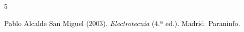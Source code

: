 \documentclass[../main]{subfiles}
\begin{document}
\begin{thebibliography}{5}

  Pablo Alcalde San Miguel (2003).
  \textit{Electrotecnia} (4.ª ed.). Madrid: Paraninfo.

\end{thebibliography}
\end{document}

